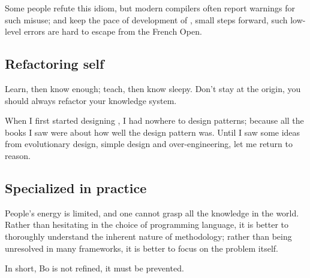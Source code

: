 \begin{content}
Some people refute this idiom, but modern compilers often report warnings for such misuse; and keep the pace of development of , small steps forward, such low-level errors are hard to escape from the French Open.


\subsection{Refactoring self}
Learn, then know enough; teach, then know sleepy. Don't stay at the origin, you should always refactor your knowledge system.

When I first started designing , I had nowhere to design patterns; because all the books I saw were about how well the design pattern was. Until I saw some ideas from evolutionary design, simple design and over-engineering, let me return to reason.


\subsection{Specialized in practice}
People's energy is limited, and one cannot grasp all the knowledge in the world. Rather than hesitating in the choice of programming language, it is better to thoroughly understand the inherent nature of methodology; rather than being unresolved in many frameworks, it is better to focus on the problem itself.

In short, Bo is not refined, it must be prevented.
\end{content}
